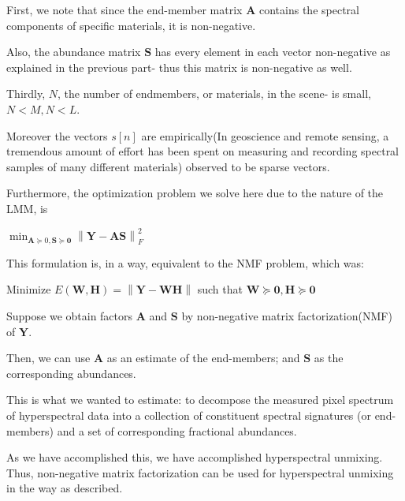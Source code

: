 \documentclass[fleqn, 11pt]{article}
\newcommand{\bs}[1]{\boldsymbol{#1}}
\newcommand\norm[1]{\left\lVert#1\right\rVert}
\begin{document}
First, we note that since the end-member matrix $\bs{A}$ contains the spectral components of specific materials, it is non-negative. 

\smallskip

Also, the abundance matrix $\bs{S}$ has every element in each vector non-negative as explained in the previous part- thus this matrix is non-negative as well. 

\smallskip

Thirdly, $N$, the number of endmembers, or materials, in the scene- is small, $N < M, N<L$.

\smallskip

Moreover the vectors $s[n]$ are empirically(In geoscience and remote sensing, a tremendous amount of effort has been spent on measuring and recording spectral samples of many different materials) observed to be sparse vectors. 


\smallskip

Furthermore, the optimization problem we solve here due to the nature of the LMM, is 
\begin{center}
    $\displaystyle \min_{ \bs{A} \succeq {0}, \bs{S \succeq 0}  } \norm{\bs{Y-AS}}^2_F$
\end{center}

This formulation is, in a way,  equivalent to the NMF problem, which was:

\begin{center}
    Minimize $E(\bs{W, H}) = \norm{\bs{Y-WH}}  $ such that $\bs{W} \succeq \bs{0}, \bs{H} \succeq \bs{0} $
\end{center}

Suppose we obtain factors $\bs{A}$ and $\bs{S}$ by non-negative matrix factorization(NMF) of $\bs{Y}$.

\smallskip

Then, we can use  $\bs{A}$ as an estimate of the end-members; and $\bs{S}$ as the corresponding abundances.

\smallskip

This is what we wanted to estimate: to decompose the measured pixel spectrum of hyperspectral data into a collection of constituent spectral signatures (or end-members) and a set of corresponding fractional abundances.

\smallskip

As we have accomplished this, we have accomplished hyperspectral unmixing.
Thus, non-negative matrix factorization can be used for hyperspectral unmixing in the way as described. 
\end{document}
